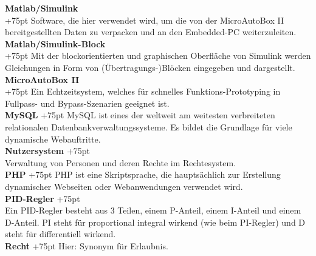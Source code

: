 \documentclass[fontsize = 12pt, paper = a4]{scrreprt}
\begin{document}
\begin{spacing}{0.95} 

\textbf{Matlab/Simulink} \\
\hangindent+75pt  
Software, die hier verwendet wird, um die von der MicroAutoBox II bereitgestellten Daten zu verpacken und an den Embedded-PC weiterzuleiten.\\

\textbf{Matlab/Simulink-Block} \\
\hangindent+75pt  
Mit der blockorientierten und graphischen Oberfläche von Simulink werden Gleichungen in Form von (Übertragungs-)Blöcken eingegeben und dargestellt.\\

\textbf{MicroAutoBox II} \\
\hangindent+75pt  
Ein Echtzeitsystem, welches für schnelles Funktions-Prototyping in Fullpass- und Bypass-Szenarien geeignet ist.\\


\textbf{MySQL}
\hangindent+75pt  
\hspace*{7.5mm}
MySQL ist eines der weltweit am weitesten verbreiteten relationalen Datenbankverwaltungssysteme. Es bildet die Grundlage für viele dynamische Webauftritte.\\

\textbf{Nutzersystem}
\hangindent+75pt  \\
Verwaltung von Personen und deren Rechte im Rechtesystem.\\


\textbf{PHP}
\hangindent+75pt 
\hspace*{13.5mm}
PHP ist eine Skriptsprache, die hauptsächlich zur Erstellung dynamischer Webseiten oder Webanwendungen verwendet wird.\\

\textbf{PID-Regler}
\hangindent+75pt  \\
Ein PID-Regler besteht aus 3 Teilen, einem P-Anteil, einem I-Anteil und einem D-Anteil. PI steht für proportional integral wirkend (wie beim PI-Regler) und D steht für differentiell wirkend.\\

\textbf{Recht}
\hangindent+75pt  
\hspace*{11.5mm} Hier: Synonym für Erlaubnis.\\


\end{spacing}
\end{document}
